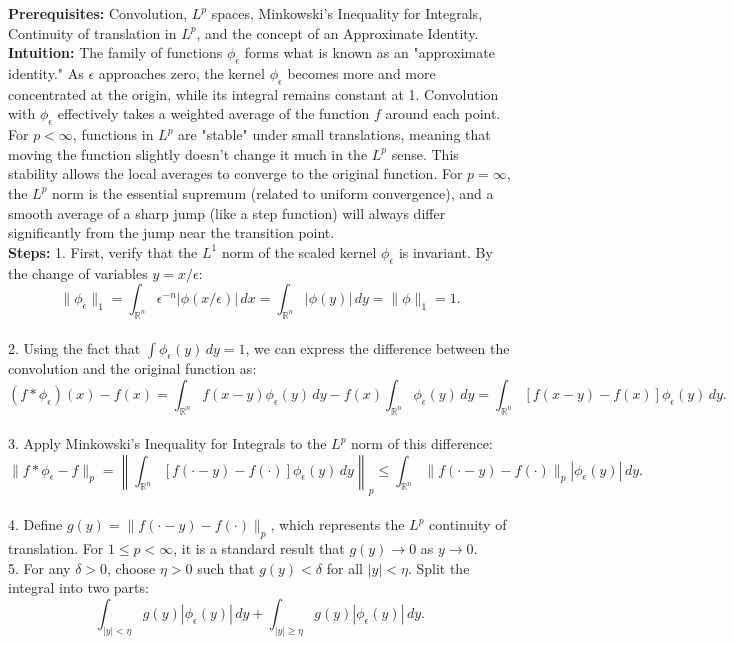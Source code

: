 \begin{solution}
\textbf{Prerequisites:} Convolution, $L^p$ spaces, Minkowski's Inequality for Integrals, Continuity of translation in $L^p$, and the concept of an Approximate Identity. \\[2ex]
\textbf{Intuition:} The family of functions $\phi_\epsilon$ forms what is known as an "approximate identity." As $\epsilon$ approaches zero, the kernel $\phi_\epsilon$ becomes more and more concentrated at the origin, while its integral remains constant at 1. Convolution with $\phi_\epsilon$ effectively takes a weighted average of the function $f$ around each point. For $p < \infty$, functions in $L^p$ are "stable" under small translations, meaning that moving the function slightly doesn't change it much in the $L^p$ sense. This stability allows the local averages to converge to the original function. For $p = \infty$, the $L^p$ norm is the essential supremum (related to uniform convergence), and a smooth average of a sharp jump (like a step function) will always differ significantly from the jump near the transition point. \\[2ex]
\textbf{Steps:}
1. First, verify that the $L^1$ norm of the scaled kernel $\phi_\epsilon$ is invariant. By the change of variables $y = x/\epsilon$:
\[
\|\phi_\epsilon\|_1 = \int_{\mathbb{R}^n} \epsilon^{-n} |\phi(x/\epsilon)| \, dx = \int_{\mathbb{R}^n} |\phi(y)| \, dy = \|\phi\|_1 = 1.
\] \\[2ex]
2. Using the fact that $\int \phi_\epsilon(y) \, dy = 1$, we can express the difference between the convolution and the original function as:
\[
(f * \phi_\epsilon)(x) - f(x) = \int_{\mathbb{R}^n} f(x-y) \phi_\epsilon(y) \, dy - f(x) \int_{\mathbb{R}^n} \phi_\epsilon(y) \, dy = \int_{\mathbb{R}^n} [f(x-y) - f(x)] \phi_\epsilon(y) \, dy.
\] \\[2ex]
3. Apply Minkowski's Inequality for Integrals to the $L^p$ norm of this difference:
\[
\|f * \phi_\epsilon - f\|_p = \left\| \int_{\mathbb{R}^n} [f(\cdot - y) - f(\cdot)] \phi_\epsilon(y) \, dy \right\|_p \leq \int_{\mathbb{R}^n} \|f(\cdot - y) - f(\cdot)\|_p |\phi_\epsilon(y)| \, dy.
\] \\[2ex]
4. Define $g(y) = \|f(\cdot - y) - f(\cdot)\|_p$, which represents the $L^p$ continuity of translation. For $1 \leq p < \infty$, it is a standard result that $g(y) \to 0$ as $y \to 0$. \\[2ex]
5. For any $\delta > 0$, choose $\eta > 0$ such that $g(y) < \delta$ for all $|y| < \eta$. Split the integral into two parts:
\[
\int_{|y|<\eta} g(y) |\phi_\epsilon(y)| \, dy + \int_{|y|\geq \eta} g(y) |\phi_\epsilon(y)| \, dy.
\]
\end{solution}
